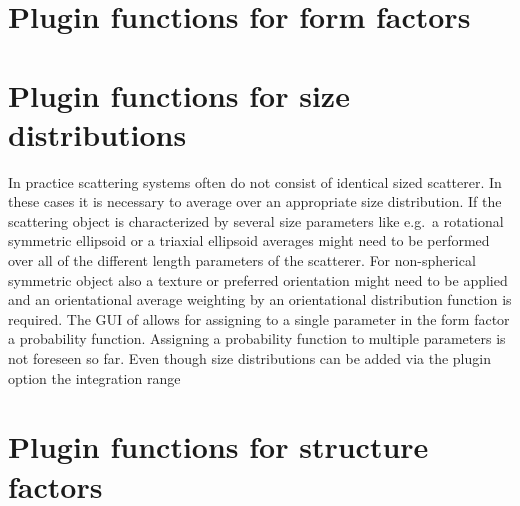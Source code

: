 \chapter{Plugin functions for form factors}
\label{ch:pluginsFF}



















\chapter{Plugin functions for size distributions}
\label{ch:pluginsSD}
In practice scattering systems often do not consist of identical sized scatterer. In these cases it is necessary to average over an appropriate size distribution. If the scattering object is characterized by several size parameters like e.g.\ a rotational symmetric ellipsoid or a triaxial ellipsoid averages might need to be performed over all of the different length parameters of the scatterer. For non-spherical symmetric object also a texture or preferred orientation might need to be applied and an orientational average weighting by an orientational distribution function is required. The GUI of \SASfit allows for assigning to a single parameter in the form factor a probability function. Assigning a probability function to multiple parameters is not foreseen so far. Even though size distributions can be added via the plugin option the integration range 



\chapter{Plugin functions for structure factors}
\label{ch:pluginsSQ}



